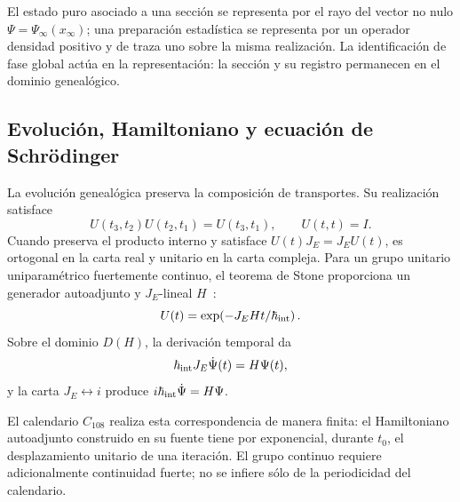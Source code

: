 \begin{principle}
\label{v:v:rec:realizacion_evolucion:statement:02}
El estado puro asociado a una sección se representa por el rayo del vector
no nulo \(\Psi=\Psi_\infty(x_\infty)\); una preparación estadística se
representa por un operador densidad positivo y de traza uno sobre la misma
realización. La identificación de fase global actúa en la representación:
la sección y su registro permanecen en el dominio genealógico.
\end{principle}

\subsection{Evolución, Hamiltoniano y ecuación de Schrödinger}
\label{v:v:rec:realizacion_evolucion:section:03}

La evolución genealógica preserva la composición de transportes. Su
realización satisface
\[
 U(t_3,t_2)U(t_2,t_1)=U(t_3,t_1),
 \qquad U(t,t)=I.
\]
Cuando preserva el producto interno y satisface
\(U(t)J_E=J_EU(t)\), es ortogonal en la carta real y unitario en la carta
compleja. Para un grupo unitario uniparamétrico fuertemente continuo, el
teorema de Stone proporciona un generador autoadjunto y \(J_E\)-lineal
\(H\)~\cite{v:Stone1932}:
\[
 U(t)=\exp\!\left(-J_E H t/\hbar_{\rm int}\right).
\]
Sobre el dominio \(D(H)\), la derivación temporal da
\begin{equation}
 \hbar_{\rm int}J_E\dot\Psi(t)=H\Psi(t),
 \label{v:v:rec:eq:schrodinger-genealogico-rev2}
\end{equation}
y la carta \(J_E\leftrightarrow i\) produce
\(i\hbar_{\rm int}\dot\Psi=H\Psi\).

El calendario \(C_{108}\) realiza esta correspondencia de manera finita:
el Hamiltoniano autoadjunto construido en su fuente tiene por
exponencial, durante \(t_0\), el desplazamiento unitario de una iteración. El
grupo continuo requiere adicionalmente continuidad fuerte; no se infiere
sólo de la periodicidad del calendario.
